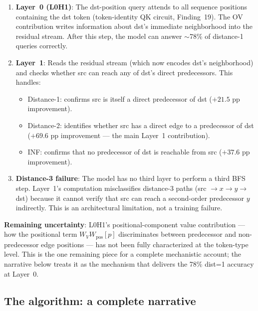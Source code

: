 \documentclass[11pt, a4paper]{article}
\begin{document}
\begin{enumerate}
  \item \textbf{Layer~0 (L0H1)}: The dst-position query attends to all
    sequence positions containing the dst token (token-identity QK circuit,
    Finding~19).  The OV contribution writes information about dst's
    immediate neighborhood into the residual stream.  After this step,
    the model can answer $\sim$78\% of distance-1 queries correctly.
  \item \textbf{Layer~1}: Reads the residual stream (which now encodes dst's
    neighborhood) and checks whether src can reach any of dst's direct
    predecessors.  This handles:
    \begin{itemize}[noitemsep]
      \item Distance-1: confirms src is itself a direct predecessor of dst
        ($+21.5$ pp improvement).
      \item Distance-2: identifies whether src has a direct edge to a
        predecessor of dst ($+69.6$ pp improvement --- the main Layer~1
        contribution).
      \item INF: confirms that no predecessor of dst is reachable from src
        ($+37.6$ pp improvement).
    \end{itemize}
  \item \textbf{Distance-3 failure}: The model has no third layer to perform
    a third BFS step.  Layer~1's computation misclassifies distance-3 paths
    (src $\to x \to y \to$ dst) because it cannot verify that src can reach
    a second-order predecessor $y$ indirectly.  This is an architectural
    limitation, not a training failure.
\end{enumerate}

\textbf{Remaining uncertainty}: L0H1's positional-component value contribution
--- how the positional term $W_V W_{\text{pos}}[p]$ discriminates between
predecessor and non-predecessor edge positions --- has not been fully
characterized at the token-type level.  This is the one remaining piece for
a complete mechanistic account; the narrative below treats it as the mechanism
that delivers the 78\% dist=1 accuracy at Layer~0.

\subsection{The algorithm: a complete narrative}
\label{sec:algorithm-narrative}
\end{document}
